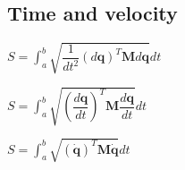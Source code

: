 
\subsection{Time and velocity}

\(S = \int_a^b \sqrt {\dfrac{1}{dt^2}(d\mathbf q)^T\mathbf Md\mathbf q}dt\)

\(S = \int_a^b \sqrt {(\dfrac{d\mathbf q}{dt})^T\mathbf M\dfrac{d\mathbf q}{dt}}dt\)

\(S = \int_a^b \sqrt {(\mathbf {\dot q})^T\mathbf M\mathbf {\dot q}}dt\)

